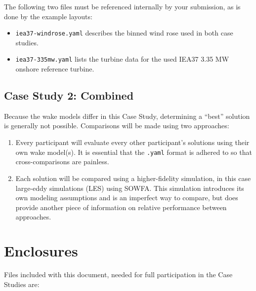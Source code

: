 \documentclass[10pt]{article}
\begin{document}
        \noindent The following two files must be referenced internally by your submission, as is done by the example layouts:
        \begin{itemize}
            \item \texttt{iea37-windrose.yaml} describes the binned wind rose used in both case studies.
            \item \texttt{iea37-335mw.yaml} lists the turbine data for the used IEA37 3.35 MW onshore reference turbine.
        \end{itemize}

    \subsection{Case Study 2: Combined}

        Because the wake models differ in this Case Study, determining a ``best'' solution is generally not possible.  Comparisons will be made using two approaches:
        \begin{enumerate}
            \item Every participant will evaluate every other participant's solutions using their own wake model(s).  It is essential that the \texttt{.yaml} format is adhered to so that cross-comparisons are painless. %
            \item Each solution will be compared using a higher-fidelity simulation, in this case large-eddy simulations (LES) using SOWFA.  This simulation introduces its own modeling assumptions and is an imperfect way to compare, but does provide another piece of information on relative performance between approaches. %
        \end{enumerate}

\section{Enclosures}
    Files included with this document, needed for full participation in the Case Studies are:
\end{document}
